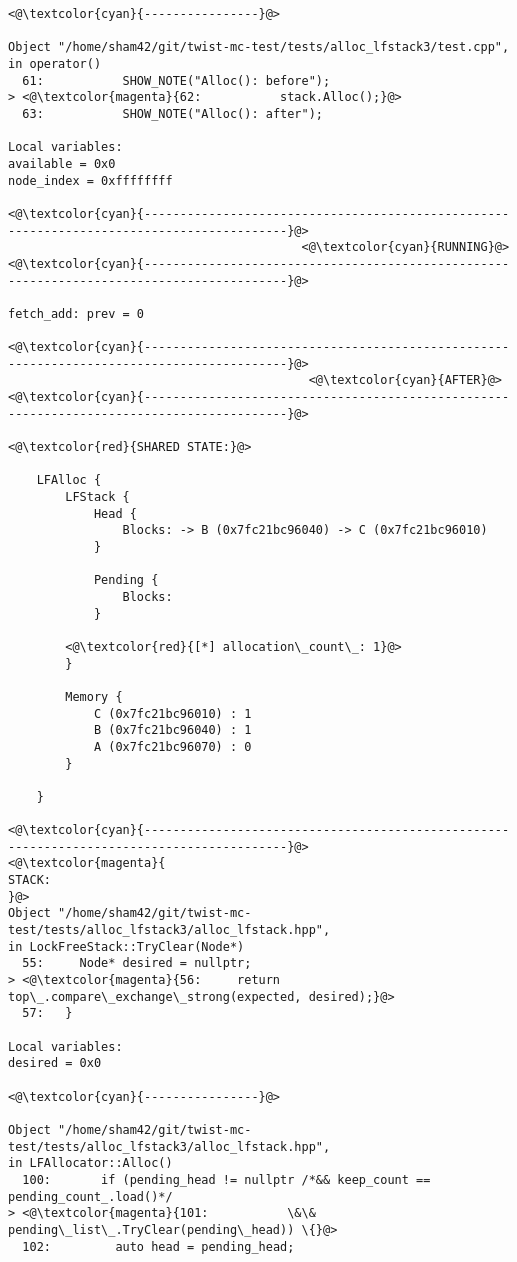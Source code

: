 \begin{adjustwidth}{-3.3cm}{-1cm}
\begin{allintypewriter}
\begin{multicols*}{2}
\begin{lstlisting}[numbers=none]
<@\textcolor{cyan}{----------------}@>

Object "/home/sham42/git/twist-mc-test/tests/alloc_lfstack3/test.cpp",
in operator()
  61:           SHOW_NOTE("Alloc(): before");
> <@\textcolor{magenta}{62:           stack.Alloc();}@>
  63:           SHOW_NOTE("Alloc(): after");

Local variables: 
available = 0x0
node_index = 0xffffffff

<@\textcolor{cyan}{------------------------------------------------------------------------------------------}@>
                                         <@\textcolor{cyan}{RUNNING}@>
<@\textcolor{cyan}{------------------------------------------------------------------------------------------}@>

fetch_add: prev = 0

<@\textcolor{cyan}{------------------------------------------------------------------------------------------}@>
                                          <@\textcolor{cyan}{AFTER}@>
<@\textcolor{cyan}{------------------------------------------------------------------------------------------}@>

<@\textcolor{red}{SHARED STATE:}@>

    LFAlloc {
	    LFStack {
		    Head {
			    Blocks: -> B (0x7fc21bc96040) -> C (0x7fc21bc96010) 
		    }

		    Pending {
			    Blocks: 
		    }

		<@\textcolor{red}{[*] allocation\_count\_: 1}@>
	    }

	    Memory {
		    C (0x7fc21bc96010) : 1
		    B (0x7fc21bc96040) : 1
		    A (0x7fc21bc96070) : 0
	    }

    }

<@\textcolor{cyan}{------------------------------------------------------------------------------------------}@>
<@\textcolor{magenta}{
STACK:
}@>
Object "/home/sham42/git/twist-mc-test/tests/alloc_lfstack3/alloc_lfstack.hpp",
in LockFreeStack::TryClear(Node*)
  55:     Node* desired = nullptr;
> <@\textcolor{magenta}{56:     return top\_.compare\_exchange\_strong(expected, desired);}@>
  57:   }

Local variables: 
desired = 0x0

<@\textcolor{cyan}{----------------}@>

Object "/home/sham42/git/twist-mc-test/tests/alloc_lfstack3/alloc_lfstack.hpp",
in LFAllocator::Alloc()
  100:       if (pending_head != nullptr /*&& keep_count == pending_count_.load()*/
> <@\textcolor{magenta}{101:           \&\& pending\_list\_.TryClear(pending\_head)) \{}@>
  102:         auto head = pending_head;


\end{lstlisting}
\end{multicols*}
\end{allintypewriter}
\end{adjustwidth}
